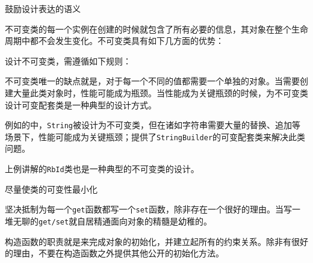 \begin{content}

\begin{advise}
鼓励设计表达的语义
\end{advise}

不可变类的每一个实例在创建的时候就包含了所有必要的信息，其对象在整个生命周期中都不会发生变化。不可变类具有如下几方面的优势：
\begin{enum}
\end{enum}

设计不可变类，需遵循如下规则：
\begin{enum}
\end{enum}

不可变类唯一的缺点就是，对于每一个不同的值都需要一个单独的对象。当需要创建大量此类对象时，性能可能成为瓶颈。当性能成为关键瓶颈的时候，为不可变类设计可变配套类是一种典型的设计方式。

例如的中，\texttt{String}被设计为不可变类，但在诸如字符串需要大量的替换、追加等场景下，性能可能成为关键瓶颈；提供了\texttt{StringBuilder}的可变配套类来解决此类问题。

上例讲解的\texttt{RbId}类也是一种典型的不可变类的设计。

\begin{regulation}
尽量使类的可变性最小化
\end{regulation}

坚决抵制为每一个\texttt{get}函数都写一个\texttt{set}函数，除非存在一个很好的理由。当写一堆无聊的\texttt{get/set}就自居精通面向对象的精髓是幼稚的。

构造函数的职责就是来完成对象的初始化，并建立起所有的约束关系。除非有很好的理由，不要在构造函数之外提供其他公开的初始化方法。

\end{content}

